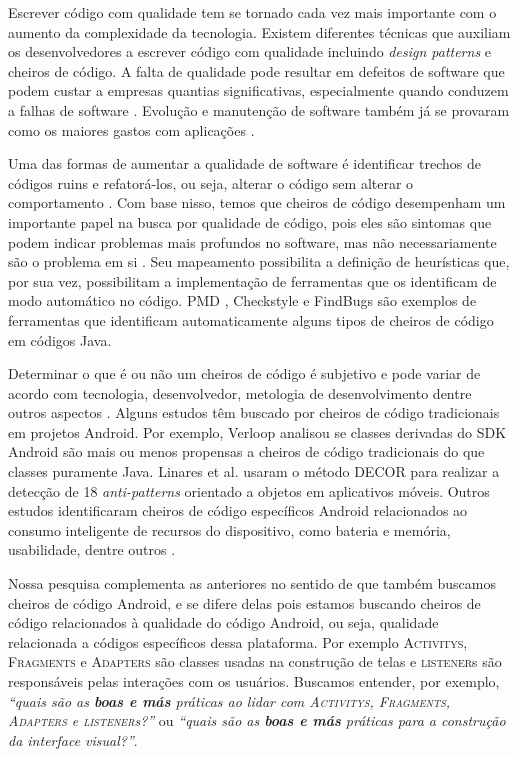 Escrever c\'odigo com qualidade tem se tornado cada vez mais importante com o aumento da complexidade da tecnologia. Existem diferentes t\'ecnicas que auxiliam os desenvolvedores a escrever c\'odigo com qualidade incluindo \textit{design patterns} e cheiros de c\'odigo. A falta de qualidade pode resultar em defeitos de software que podem custar a empresas quantias significativas, especialmente quando conduzem a falhas de software \cite{Nagappan:2005, briand1993modeling}. Evolu\c{c}\~ao e manuten\c{c}\~ao de software tamb\'em j\'a se provaram como os maiores gastos com aplica\c{c}\~oes \cite{RefactoringAndImprovements:10}.

Uma das formas de aumentar a qualidade de software \'e identificar trechos de c\'odigos ruins e refator\'a-los, ou seja, alterar o c\'odigo sem alterar o comportamento \cite{Refactoring:99}. Com base nisso, temos que cheiros de c\'odigo desempenham um importante papel na busca por qualidade de c\'odigo, pois eles s\~ao sintomas que podem indicar problemas mais profundos no software, mas n\~ao necessariamente s\~ao o problema em si \cite{CodeSmell:06}. Seu mapeamento possibilita a defini\c{c}\~ao de heur\'isticas que, por sua vez, possibilitam a implementa\c{c}\~ao de ferramentas que os identificam de modo autom\'atico no c\'odigo. PMD \cite{PMD2016}, Checkstyle e FindBugs s\~ao exemplos de ferramentas que identificam automaticamente alguns tipos de cheiros de c\'odigo em c\'odigos Java.

Determinar o que \'e ou n\~ao um cheiros de c\'odigo \'e subjetivo e pode variar de acordo com tecnologia, desenvolvedor, metologia de desenvolvimento dentre outros aspectos \cite{WikiCodeSmell}. Alguns estudos t\^em buscado por cheiros de c\'odigo tradicionais em projetos Android. Por exemplo, Verloop \cite{MobileSmells:13} analisou se classes derivadas do SDK Android s\~ao mais ou menos propensas a cheiros de c\'odigo tradicionais do que classes puramente Java. Linares et al. \cite{DomainMatters} usaram o m\'etodo DECOR para realizar a detec\c{c}\~ao de 18 \textit{anti-patterns} orientado a objetos em aplicativos m\'oveis. Outros estudos identificaram cheiros de c\'odigo espec\'ificos Android relacionados ao consumo inteligente de recursos do dispositivo, como bateria e mem\'oria, usabilidade, dentre outros \cite{EnergyAndroidSmells, ReimannBrylski2013}. 

Nossa pesquisa complementa as anteriores no sentido de que tamb\'em buscamos cheiros de c\'odigo Android, e se difere delas pois estamos buscando cheiros de c\'odigo relacionados \`a qualidade do c\'odigo Android, ou seja, qualidade relacionada a c\'odigos espec\'ificos dessa plataforma. Por exemplo \textsc{Activitys}, \textsc{Fragments} e \textsc{Adapters} s\~ao classes usadas na constru\c{c}\~ao de telas e \textsc{listener}s s\~ao respons\'aveis pelas intera\c{c}\~oes com os usu\'arios. Buscamos entender, por exemplo, \textit{``quais s\~ao as \textbf{boas e m\'as} pr\'aticas ao lidar com \textsc{Activitys}, \textsc{Fragments}, \textsc{Adapters} e \textsc{listener}s?''} ou \textit{``quais s\~ao as \textbf{boas e m\'as} pr\'aticas para a constru\c{c}\~ao da interface visual?''}. 

